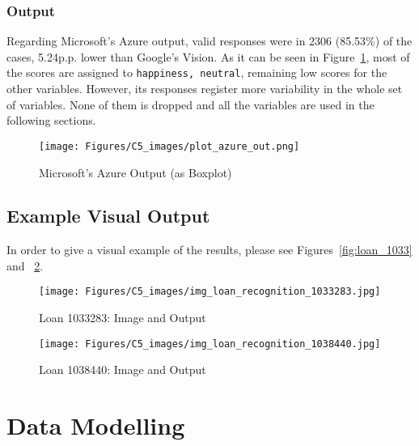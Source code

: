 \subsubsection{Output}
Regarding Microsoft's Azure output, valid responses were in 2306 (85.53\%) of the cases, 5.24p.p. lower than Google's Vision.
As it can be seen in Figure~\ref{fig:A_output}, most of the scores are assigned to \texttt{happiness, neutral}, remaining low scores for the other variables.
However, its responses register more variability in the whole set of variables. None of them is dropped and all the variables are used in the following sections.

\begin{figure}[H]
\centering
\texttt{[image: Figures/C5\_images/plot\_azure\_out.png]}
\caption{Microsoft's Azure Output (as Boxplot)}
\label{fig:A_output}
\end{figure}


\subsection{Example Visual Output}
In order to give a visual example of the results, please see Figures~\ref{fig:loan_1033} and ~\ref{fig:loan_1038}.

\begin{figure}[H]
\centering
\texttt{[image: Figures/C5\_images/img\_loan\_recognition\_1033283.jpg]}
\caption{Loan 1033283: Image and Output}
\label{fig:loan_1033}
\bigbreak
\texttt{[image: Figures/C5\_images/img\_loan\_recognition\_1038440.jpg]}
\caption{Loan 1038440: Image and Output}
\label{fig:loan_1038}
\end{figure}
% 
% 

\section{Data Modelling}

